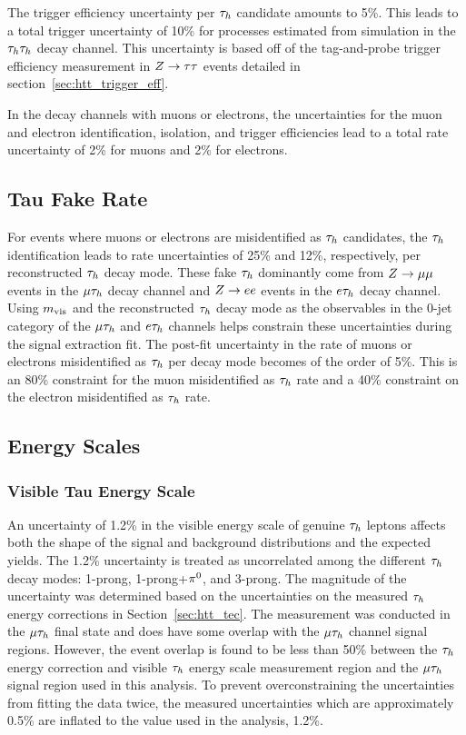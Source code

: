 The trigger efficiency uncertainty per $\tau_{h}$ candidate amounts to 5\%. This leads to a total 
trigger uncertainty of 10\% for processes estimated from simulation in the $\tau_{h}\tau_{h}$ decay channel. 
This uncertainty is based off of the tag-and-probe trigger efficiency measurement in 
$Z\to\tau\tau$ events detailed in section~\ref{sec:htt_trigger_eff}.

In the decay channels with muons or electrons, the uncertainties for the muon and electron identification, 
isolation, and trigger efficiencies lead to a total rate uncertainty of 2\% for muons and 2\% for electrons.


\subsection{Tau Fake Rate}
For events where muons or electrons are misidentified as $\tau_{h}$ candidates, the $\tau_{h}$ identification leads 
to rate uncertainties of 25\% and 12\%, respectively, per reconstructed $\tau_{h}$ decay mode. These fake $\tau_{h}$
dominantly come from $Z\to\mu\mu$ events in the $\mu\tau_{h}$ decay channel and $Z\to ee$ events 
in the $e\tau_{h}$ decay channel. Using $m_\text{vis}$ and the reconstructed 
$\tau_{h}$ decay mode as the observables in the 0-jet category of the $\mu\tau_{h}$ and $e\tau_{h}$ channels helps constrain these 
uncertainties during the signal extraction fit. The post-fit uncertainty in the rate of muons or electrons 
misidentified as $\tau_{h}$ per decay mode becomes of the order of 5\%. This is an 80\% constraint for the muon
misidentified as $\tau_{h}$ rate and a 40\% constraint on the electron misidentified as $\tau_{h}$ rate.


\subsection{Energy Scales}
\subsubsection{Visible Tau Energy Scale}
An uncertainty of 1.2\% in the visible energy scale of genuine $\tau_{h}$ leptons affects both the shape of the
signal and background distributions and the expected yields. The 1.2\% uncertainty is treated as uncorrelated 
among the different $\tau_{h}$ decay modes: 1-prong, 1-prong+$\pi^{0}$, and 3-prong.
The magnitude of the uncertainty was determined based on the uncertainties on the measured $\tau_{h}$ energy 
corrections in Section~\ref{sec:htt_tec}. The measurement was conducted in the $\mu\tau_{h}$ final state and
does have some overlap with the $\mu\tau_{h}$ channel signal regions. However, the event overlap is found to be
less than 50\% between the $\tau_{h}$ energy correction and visible $\tau_{h}$ energy scale measurement region and the
$\mu\tau_{h}$ signal region used in this analysis. To prevent overconstraining the uncertainties from
fitting the data twice, the measured uncertainties which are approximately 0.5\% are inflated to the
value used in the analysis, 1.2\%.

